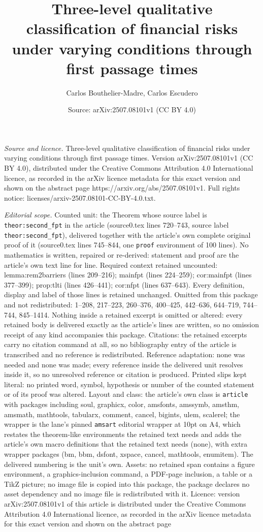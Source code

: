 \documentclass[10pt,a4paper]{amsart}
\title[Three-level qualitative classification of financial risks un]{Three-level qualitative classification of financial risks under varying conditions through first passage times}
\author{Carlos Bouthelier-Madre, Carlos Escudero}
\date{Source: arXiv:2507.08101v1 (CC BY 4.0)}
\begin{document}
\maketitle

\noindent\emph{Source and licence.} Three-level qualitative classification of financial risks under varying conditions through first passage times. Version arXiv:2507.08101v1 (CC BY 4.0), distributed under the Creative Commons Attribution 4.0 International licence, as recorded in the arXiv licence metadata for this exact version and shown on the abstract page https://arxiv.org/abs/2507.08101v1. Full rights notice: licenses/arxiv-2507.08101-CC-BY-4.0.txt.\par\smallskip

\noindent\textit{Editorial scope.} Counted unit: the Theorem whose source label is \texttt{theor:second\_fpt} in the article (source0.tex lines 720--743, source label \texttt{theor:second\_fpt}), delivered together with the article's own complete original proof of it (source0.tex lines 745--844, one \texttt{proof} environment of 100 lines). No mathematics is written, repaired or re-derived: statement and proof are the article's own text line for line. Required context retained uncounted: lemma:rem2barriers (lines 209--216); mainfpt (lines 224--259); cor:mainfpt (lines 377--399); prop:tlti (lines 426--441); cor:nfpt (lines 637--643). Every definition, display and label of those lines is retained unchanged. Omitted from this package and not redistributed: 1--208, 217--223, 260--376, 400--425, 442--636, 644--719, 744--744, 845--1414. Nothing inside a retained excerpt is omitted or altered: every retained body is delivered exactly as the article's lines are written, so no omission receipt of any kind accompanies this package. Citations: the retained excerpts carry no citation command at all, so no bibliography entry of the article is transcribed and no reference is redistributed. Reference adaptation: none was needed and none was made; every reference inside the delivered unit resolves inside it, so no unresolved reference or citation is produced. Printed slips kept literal: no printed word, symbol, hypothesis or number of the counted statement or of its proof was altered. Layout and class: the article's own class is \texttt{article} with packages including soul, graphicx, color, amsfonts, amssymb, amsthm, amsmath, mathtools, tabularx, comment, cancel, bigints, ulem, scalerel; the wrapper is the lane's pinned \texttt{amsart} editorial wrapper at 10pt on A4, which restates the theorem-like environments the retained text needs and adds the article's own macro definitions that the retained text needs (none), with extra wrapper packages (bm, bbm, dsfont, xspace, cancel, mathtools, enumitem). The delivered numbering is the unit's own. Assets: no retained span contains a figure environment, a graphics-inclusion command, a PDF-page inclusion, a table or a TikZ picture; no image file is copied into this package, the package declares no asset dependency and no image file is redistributed with it. Licence: version arXiv:2507.08101v1 of this article is distributed under the Creative Commons Attribution 4.0 International licence, as recorded in the arXiv licence metadata for this exact version and shown on the abstract page 
\end{document}
